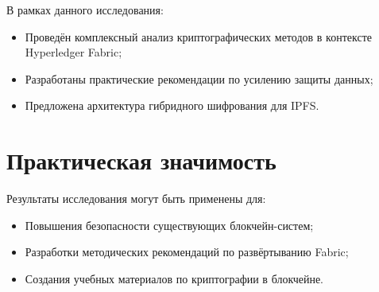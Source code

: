 \documentclass[a4paper,14pt]{extreport}
\begin{document}
В рамках данного исследования:
\begin{itemize}
    \item Проведён комплексный анализ криптографических методов в контексте Hyperledger Fabric;
    \item Разработаны практические рекомендации по усилению защиты данных;
    \item Предложена архитектура гибридного шифрования для IPFS.
\end{itemize}

\section{Практическая значимость}

Результаты исследования могут быть применены для:
\begin{itemize}
    \item Повышения безопасности существующих блокчейн-систем;
    \item Разработки методических рекомендаций по развёртыванию Fabric;
    \item Создания учебных материалов по криптографии в блокчейне.
\end{itemize}

\newpage
\end{document}
